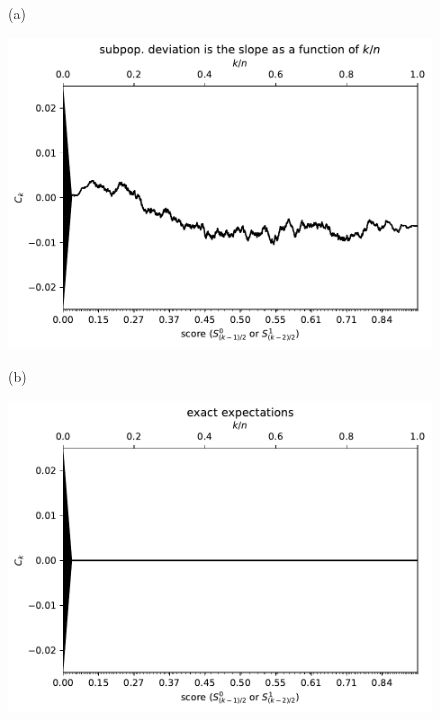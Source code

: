 \documentclass{article}
\newlength{\vertsep}
\newlength{\imsize}
\begin{document}
\begin{figure}
\begin{centering}

(a)
\parbox{\imsize}{\includegraphics[width=\imsize]
{../codes/unweighted/10000_7000_10_3/cumulative.pdf}}
\quad\quad
(b)
\parbox{\imsize}{\includegraphics[width=\imsize]
{../codes/unweighted/10000_7000_10_3/cumulative_exact.pdf}}

\vspace{\vertsep}


\end{centering}
\end{figure}
\end{document}
